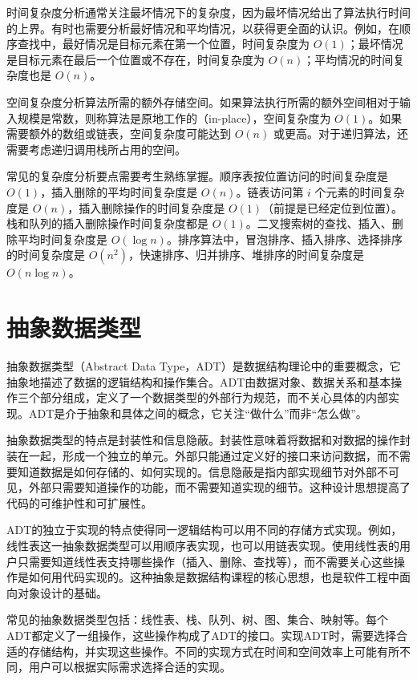 \documentclass[12pt, a4paper]{article}
\begin{document}
时间复杂度分析通常关注最坏情况下的复杂度，因为最坏情况给出了算法执行时间的上界。有时也需要分析最好情况和平均情况，以获得更全面的认识。例如，在顺序查找中，最好情况是目标元素在第一个位置，时间复杂度为 $O(1)$；最坏情况是目标元素在最后一个位置或不存在，时间复杂度为 $O(n)$；平均情况的时间复杂度也是 $O(n)$。

空间复杂度分析算法所需的额外存储空间。如果算法执行所需的额外空间相对于输入规模是常数，则称算法是原地工作的（in-place），空间复杂度为 $O(1)$。如果需要额外的数组或链表，空间复杂度可能达到 $O(n)$ 或更高。对于递归算法，还需要考虑递归调用栈所占用的空间。

常见的复杂度分析要点需要考生熟练掌握。顺序表按位置访问的时间复杂度是 $O(1)$，插入删除的平均时间复杂度是 $O(n)$。链表访问第 $i$ 个元素的时间复杂度是 $O(n)$，插入删除操作的时间复杂度是 $O(1)$（前提是已经定位到位置）。栈和队列的插入删除操作时间复杂度都是 $O(1)$。二叉搜索树的查找、插入、删除平均时间复杂度是 $O(\log n)$。排序算法中，冒泡排序、插入排序、选择排序的时间复杂度是 $O(n^2)$，快速排序、归并排序、堆排序的时间复杂度是 $O(n \log n)$。

\section{抽象数据类型}

抽象数据类型（Abstract Data Type，ADT）是数据结构理论中的重要概念，它抽象地描述了数据的逻辑结构和操作集合。ADT由数据对象、数据关系和基本操作三个部分组成，定义了一个数据类型的外部行为规范，而不关心具体的内部实现。ADT是介于抽象和具体之间的概念，它关注“做什么”而非“怎么做”。

抽象数据类型的特点是封装性和信息隐蔽。封装性意味着将数据和对数据的操作封装在一起，形成一个独立的单元。外部只能通过定义好的接口来访问数据，而不需要知道数据是如何存储的、如何实现的。信息隐蔽是指内部实现细节对外部不可见，外部只需要知道操作的功能，而不需要知道实现的细节。这种设计思想提高了代码的可维护性和可扩展性。

ADT的独立于实现的特点使得同一逻辑结构可以用不同的存储方式实现。例如，线性表这一抽象数据类型可以用顺序表实现，也可以用链表实现。使用线性表的用户只需要知道线性表支持哪些操作（插入、删除、查找等），而不需要关心这些操作是如何用代码实现的。这种抽象是数据结构课程的核心思想，也是软件工程中面向对象设计的基础。

常见的抽象数据类型包括：线性表、栈、队列、树、图、集合、映射等。每个ADT都定义了一组操作，这些操作构成了ADT的接口。实现ADT时，需要选择合适的存储结构，并实现这些操作。不同的实现方式在时间和空间效率上可能有所不同，用户可以根据实际需求选择合适的实现。
\end{document}
